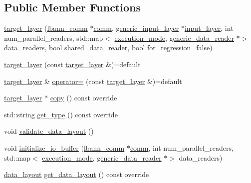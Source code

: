 \subsection*{Public Member Functions}
\begin{DoxyCompactItemize}
\item 
\hyperlink{classlbann_1_1target__layer_ab06729051345c739c33ea445ceed100a}{target\+\_\+layer} (\hyperlink{classlbann_1_1lbann__comm}{lbann\+\_\+comm} $\ast$\hyperlink{file__io_8cpp_ab048c6f9fcbcfaa57ce68b00263dbebe}{comm}, \hyperlink{classlbann_1_1generic__input__layer}{generic\+\_\+input\+\_\+layer} $\ast$\hyperlink{classlbann_1_1input__layer}{input\+\_\+layer}, int num\+\_\+parallel\+\_\+readers, std\+::map$<$ \hyperlink{base_8hpp_a2781a159088df64ed7d47cc91c4dc0a8}{execution\+\_\+mode}, \hyperlink{classlbann_1_1generic__data__reader}{generic\+\_\+data\+\_\+reader} $\ast$$>$ data\+\_\+readers, bool shared\+\_\+data\+\_\+reader, bool for\+\_\+regression=false)
\item 
\hyperlink{classlbann_1_1target__layer_a71d286715ce29b557e1554a5b9b64b51}{target\+\_\+layer} (const \hyperlink{classlbann_1_1target__layer}{target\+\_\+layer} \&)=default
\item 
\hyperlink{classlbann_1_1target__layer}{target\+\_\+layer} \& \hyperlink{classlbann_1_1target__layer_a5ff0ef949286e2eb336c1baf10ed6df6}{operator=} (const \hyperlink{classlbann_1_1target__layer}{target\+\_\+layer} \&)=default
\item 
\hyperlink{classlbann_1_1target__layer}{target\+\_\+layer} $\ast$ \hyperlink{classlbann_1_1target__layer_a7cff9e162514ee6c8be9803ba3902fca}{copy} () const override
\item 
std\+::string \hyperlink{classlbann_1_1target__layer_a6b5dad32cf3b771d6db1f99914ab63c4}{get\+\_\+type} () const override
\item 
void \hyperlink{classlbann_1_1target__layer_a34b7fe0522350d9fef731ae0642a8931}{validate\+\_\+data\+\_\+layout} ()
\item 
void \hyperlink{classlbann_1_1target__layer_a566c3d94992d4cbc4f17b4084664cc34}{initialize\+\_\+io\+\_\+buffer} (\hyperlink{classlbann_1_1lbann__comm}{lbann\+\_\+comm} $\ast$\hyperlink{file__io_8cpp_ab048c6f9fcbcfaa57ce68b00263dbebe}{comm}, int num\+\_\+parallel\+\_\+readers, std\+::map$<$ \hyperlink{base_8hpp_a2781a159088df64ed7d47cc91c4dc0a8}{execution\+\_\+mode}, \hyperlink{classlbann_1_1generic__data__reader}{generic\+\_\+data\+\_\+reader} $\ast$$>$ data\+\_\+readers)
\item 
\hyperlink{base_8hpp_a786677cbfb3f5677b4d84f3056eb08db}{data\+\_\+layout} \hyperlink{classlbann_1_1target__layer_a48a5f44e5f453ce31923333fd11849b1}{get\+\_\+data\+\_\+layout} () const override

\end{DoxyCompactItemize}
